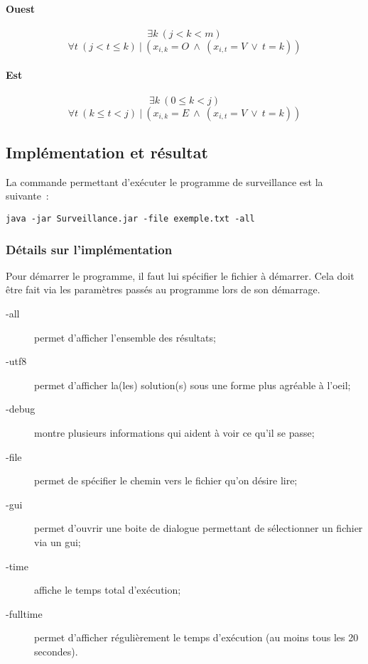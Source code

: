 \documentclass[a4paper,11pt]{article}
\newcommand{\AND}{~\wedge~}
\newcommand{\OR}{~\vee~}
\newcommand{\TQ}{~|~}
\begin{document}
          \paragraph{Ouest}
          	  \[ \exists k~(j < k < m) \]
              \[ \forall t~(j < t \leq k) \TQ (x_{i, k} = O \AND (x_{i, t} = V \OR t = k)) \]

          \paragraph{Est}
              \[ \exists k~(0 \leq k < j) \]
              \[ \forall t~(k \leq t < j) \TQ (x_{i, k} = E \AND (x_{i, t} = V \OR t = k)) \]
    
    \subsection{Implémentation et résultat}
    
    	La commande permettant d'exécuter le programme de surveillance est la suivante~:
        \begin{verbatim}
java -jar Surveillance.jar -file exemple.txt -all
        \end{verbatim}
    	\subsubsection{Détails sur l'implémentation}
        	Pour démarrer le programme, il faut lui spécifier le fichier à démarrer. Cela doit être fait via les paramètres passés au programme lors de son démarrage.
        	\begin{description}
              \item[-all] permet d'afficher l'ensemble des résultats;
              \item[-utf8] permet d'afficher la(les) solution(s) sous une forme plus agréable à l'oeil;
              \item[-debug] montre plusieurs informations qui aident à voir ce qu'il se passe;
              \item[-file] permet de spécifier le chemin vers le fichier qu'on désire lire;
              \item[-gui] permet d'ouvrir une boite de dialogue permettant de sélectionner un fichier via un gui;
              \item[-time] affiche le temps total d'exécution;
              \item[-fulltime] permet d'afficher régulièrement le temps d'exécution (au moins tous les 20 secondes).
        \end{description}
            
\end{document}

